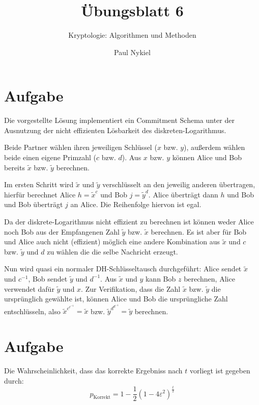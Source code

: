 \documentclass[DIN, pagenumber=false, fontsize=11pt, parskip=half]{scrartcl}
\title{Übungsblatt 6}
\subtitle{Kryptologie: Algorithmen und Methoden}
\author{Paul Nykiel}
\begin{document}
    \maketitle
    \section{Aufgabe}
    Die vorgestellte Lösung implementiert ein Commitment Schema unter der Ausnutzung
    der nicht effizienten Lösbarkeit des diskreten-Logarithmus.

    Beide Partner wählen ihren jeweiligen Schlüssel ($x$ bzw. $y$), außerdem wählen 
    beide einen eigene Primzahl ($c$ bzw. $d$). Aus $x$ bzw. $y$ können Alice und Bob
    bereits $\tilde{x}$ bzw. $\tilde{y}$ berechnen.

    Im ersten Schritt wird $\tilde{x}$ und $\tilde{y}$ verschlüsselt an den jeweilig 
    anderen übertragen, hierfür berechnet Alice $h=\tilde{x}^c$ und Bob $j=\tilde{y}^d$.
    Alice überträgt dann $h$ und Bob und Bob überträgt $j$ an Alice.
    Die Reihenfolge hiervon ist egal.

    Da der diskrete-Logarithmus nicht effizient zu berechnen ist können weder Alice 
    noch Bob aus der Empfangenen Zahl $\tilde{y}$ bzw. $\tilde{x}$ berechnen.
    Es ist aber für Bob und Alice auch nicht (effizient) möglich eine andere Kombination
    aus $\tilde{x}$ und $c$ bzw. $\tilde{y}$ und $d$ zu wählen die die selbe Nachricht
    erzeugt.
         
    Nun wird quasi ein normaler DH-Schlüsseltausch durchgeführt: Alice sendet 
    $\tilde{x}$ und $c^{-1}$, Bob sendet $\tilde{y}$ und $d^{-1}$. Aus $\tilde{x}$ und
    $y$ kann Bob $z$ berechnen, Alice verwendet dafür $\tilde{y}$ und $x$.
    Zur Verifikation, dass die Zahl $\tilde{x}$ bzw. $\tilde{y}$ die ursprünglich
    gewählte ist, können Alice und Bob die ursprüngliche Zahl entschlüsseln, also
    $\tilde{x}^{c^{c^{-1}}} = \tilde{x}$ bzw. $\tilde{y}^{d^{d^{-1}}} = \tilde{y}$ berechnen.

    \section{Aufgabe}
    Die Wahrscheinlichkeit, dass das korrekte Ergebniss nach $t$ vorliegt ist gegeben durch:
    \begin{equation}
        p_\text{Korrekt} = 1 - \frac{1}{2} {\left(1 - 4 \varepsilon^2 \right)}^{\frac{t}{2}}
    \end{equation}
    
\end{document}
